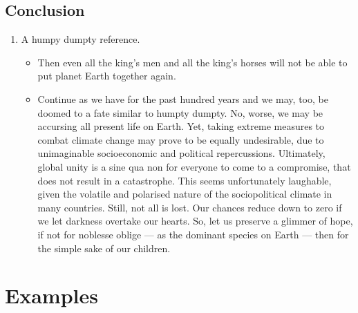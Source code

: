 \documentclass[oneside]{book}
\begin{document}
\subsection{Conclusion}
\begin{enumerate}
    \item A humpy dumpty reference. 
    \begin{itemize}
        \item Then even all the king's men and all the king's horses will not be able to put planet Earth together again.
        \item Continue as we have for the past hundred years and we may, too, be doomed to a fate similar to humpty dumpty. No, worse, we may be accursing all present life on Earth. Yet, taking extreme measures to combat climate change may prove to be equally undesirable, due to unimaginable socioeconomic and political repercussions. Ultimately, global unity is a sine qua non for everyone to come to a compromise, that does not result in a catastrophe. This seems unfortunately laughable, given the volatile and polarised nature of the sociopolitical climate in many countries. Still, not all is lost. Our chances reduce down to zero if we let darkness overtake our hearts. So, let us preserve a glimmer of hope, if not for noblesse oblige --- as the dominant species on Earth --- then for the simple sake of our children.
    \end{itemize}
\end{enumerate}
\section{Examples}
\end{document}

